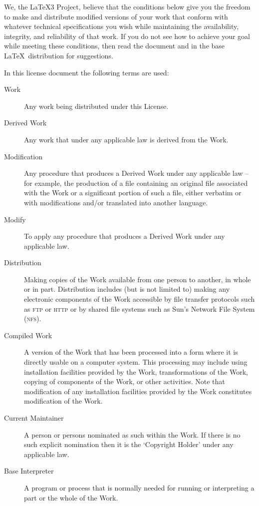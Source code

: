 \begin{LPPLicense}
    We, the \LaTeX3 Project, believe that the conditions below give you the
    freedom to make and distribute modified versions of your work that conform
    with whatever technical specifications you wish while maintaining the
    availability, integrity, and reliability of that work.  If you do not see
    how to achieve your goal while meeting these conditions, then read the
    document  and  in the base
    \LaTeX\ distribution for suggestions.


    \label{LPPL:Definitions}

    In this license document the following terms are used:

    \begin{description}
        \item[Work] Any work being distributed under this License.
        \item[Derived Work] Any work that under any applicable law is
            derived from the Work.
        \item[Modification] Any procedure that produces a Derived Work under
            any applicable law -- for example, the production of a file
            containing an original file associated with the Work or a
            significant portion of such a file, either verbatim or with
            modifications and/or translated into another language.
        \item[Modify] To apply any procedure that produces a Derived Work
            under any applicable law.
        \item[Distribution] Making copies of the Work available from one
            person to another, in whole or in part.  Distribution includes (but
            is not limited to) making any electronic components of the Work
            accessible by file transfer protocols such as \textsc{ftp} or
            \textsc{http} or by shared file systems such as Sun's Network File
            System (\textsc{nfs}).
        \item[Compiled Work] A version of the Work that has been processed
            into a form where it is directly usable on a computer system.
            This processing may include using installation facilities provided
            by the Work, transformations of the Work, copying of components of
            the Work, or other activities.  Note that modification of any
            installation facilities provided by the Work constitutes
            modification of the Work.
        \item[Current Maintainer] A person or persons nominated as such
        within the Work.  If there is no such explicit nomination then it
        is the `Copyright Holder' under any applicable law.
        \item[Base Interpreter] A program or process that is normally needed
            for running or interpreting a part or the whole of the Work.


\end{description}
\end{LPPLicense}

